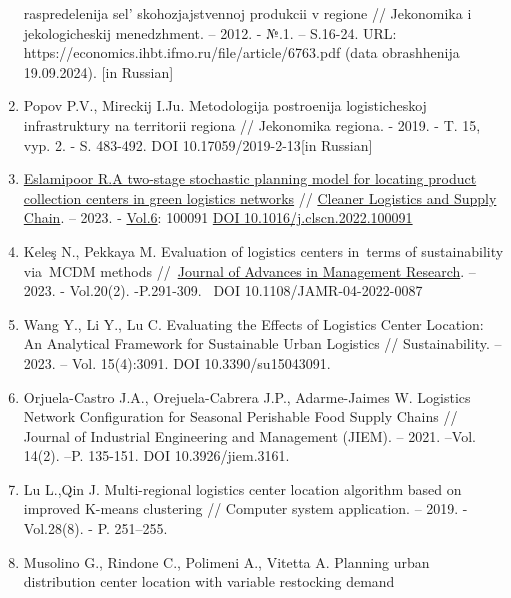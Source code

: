 \begin{enumerate}
  raspredelenija sel' skohozjajstvennoj produkcii v
  regione // Jekonomika i jekologicheskij menedzhment. -- 2012. - №.1.
  -- S.16-24. URL: https://economics.ihbt.ifmo.ru/file/article/6763.pdf
  (data obrashhenija 19.09.2024). {[}in Russian{]}
\item
  Popov P.V., Mireckij I.Ju. Metodologija postroenija logisticheskoj
  infrastruktury na territorii regiona // Jekonomika regiona. - 2019. -
  T. 15, vyp. 2. - S. 483-492. DOI 10.17059/2019-2-13{[}in Russian{]}
\item
  \href{https://www.scopus.com/authid/detail.uri?origin=resultslist&authorId=55624611200&zone=}{Eslamipoor
  R.}\href{https://www.scopus.com/record/display.uri?eid=2-s2.0-85146138004&origin=resultslist&sort=plf-f&src=s&st1=logistics+center&sid=608c0e84c46c21631ea70ffcaa21b2a6&sot=b&sdt=b&sl=23&s=TITLE\%28logistics+center\%29&relpos=0&citeCnt=0&searchTerm=}{A
  two-stage stochastic planning model for locating product collection
  centers in green logistics networks} //
  \href{https://www.scopus.com/sourceid/21101098869?origin=resultslist}{Cleaner
  Logistics and Supply Chain}. -- 2023. -
  \href{https://www.sciencedirect.com/journal/cleaner-logistics-and-supply-chain/vol/6/suppl/C}{Vol.6}:
  100091 \href{https://doi.org/10.1016/j.clscn.2022.100091}{DOI
  10.1016/j.clscn.2022.100091}
\item
  Keleş N., Pekkaya M. Evaluation of logistics centers in~terms of
  sustainability via~MCDM methods
  //~\href{https://www.emerald.com/insight/publication/issn/0972-7981}{Journal
  of Advances in Management Research}. -- 2023. - Vol.20(2).
  -P.291-309.~ DOI 10.1108/JAMR-04-2022-0087
\item
  Wang Y., Li Y., Lu C. Evaluating the Effects of Logistics Center
  Location: An Analytical Framework for Sustainable Urban Logistics //
  Sustainability. -- 2023. -- Vol. 15(4):3091. DOI 10.3390/su15043091.
\item
  Orjuela-Castro J.A., Orejuela-Cabrera J.P., Adarme-Jaimes W. Logistics
  Network Configuration for Seasonal Perishable Food Supply Chains //
  Journal of Industrial Engineering and Management (JIEM). -- 2021.
  --Vol. 14(2). --P. 135-151. DOI 10.3926/jiem.3161.
\item
  Lu L.,Qin J. Multi-regional logistics center location algorithm based
  on improved K-means clustering // Computer system application. --
  2019. - Vol.28(8). - P. 251--255.
\item
  Musolino G., Rindone C., Polimeni A., Vitetta A. Planning urban
  distribution center location with variable restocking demand

\end{enumerate}

